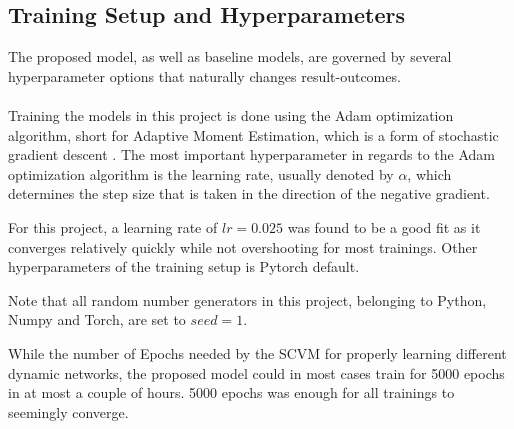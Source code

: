 \subsection{Training Setup and Hyperparameters}
\label{sec:Method:Reproducibility:TrainingSetup}
The proposed model, as well as baseline models, are governed by several hyperparameter options that naturally changes result-outcomes. 
\\\\
Training the models in this project is done using the Adam optimization algorithm, short for Adaptive Moment Estimation, which is a form of stochastic gradient descent \cite{Kingma2014Adam:Optimization}.
The most important hyperparameter in regards to the Adam optimization algorithm is the learning rate, usually denoted by $\alpha$, which determines the step size that is taken in the direction of the negative gradient. 

For this project, a learning rate of $lr = 0.025$ was found to be a good fit as it converges relatively quickly while not overshooting for most trainings.
Other hyperparameters of the training setup is Pytorch default.

Note that all random number generators in this project, belonging to Python, Numpy and Torch, are set to $seed = 1$.

While the number of Epochs needed by the SCVM for properly learning different dynamic networks, the proposed model could in most cases train for 5000 epochs in at most a couple of hours.
5000 epochs was enough for all trainings to seemingly converge.

